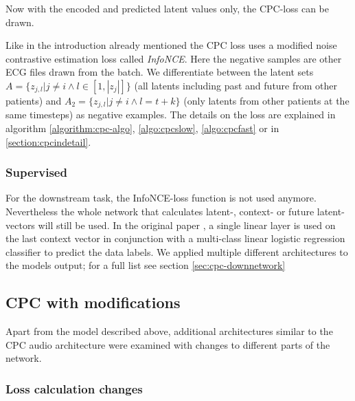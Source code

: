 Now with the encoded and predicted latent values only, the CPC-loss can be drawn.

Like in the introduction already mentioned the CPC loss uses a modified noise contrastive estimation loss called \textit{InfoNCE}. Here the negative samples are other ECG files drawn from the batch. We differentiate between the latent sets $A=\{z_{j,l}|j\neq i \land l\in[1, |z_j|]\}$ (all latents including past and future from other patients) and $A_2=\{z_{j,l}|j\neq i \land l = t+k\}$ (only latents from other patients at the same timesteps) as negative examples. The details on the loss are explained in algorithm \autoref{algorithm:cpc-algo}, \autoref{algo:cpcslow}, \autoref{algo:cpcfast} or in \autoref{section:cpcindetail}.

\subsubsection{Supervised}\label{sec:cpc-supervised}
For the downstream task, the InfoNCE-loss function is not used anymore. Nevertheless the whole network that calculates latent-, context- or future latent-vectors will still be used. In the original paper \autocite{DBLP:journals/corr/abs-1807-03748}, a single linear layer is used on the last context vector in conjunction with a multi-class linear logistic regression classifier to predict the data labels. We applied multiple different architectures to the models output; for a full list see section \autoref{sec:cpc-downnetwork}

\subsection{CPC with modifications}
Apart from the model described above, additional architectures similar to the CPC audio architecture were examined with changes to different parts of the network.

\subsubsection{Loss calculation changes}
